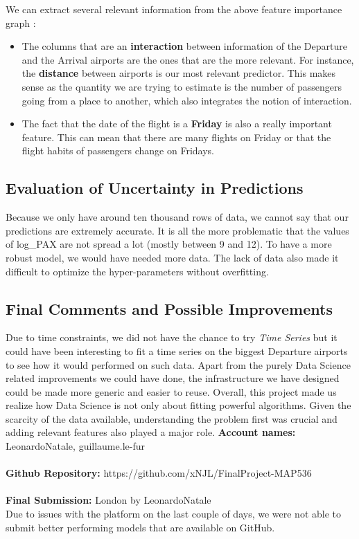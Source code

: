 \documentclass[a4paper,12pt,twoside]{article}
\begin{document}
We can extract several relevant information from the above feature importance graph :

\begin{itemize}
	\item The columns that are an \textbf{interaction} between information of the Departure and the Arrival airports are the ones that are the more relevant. For instance, the \textbf{distance} between airports is our most relevant predictor. This makes sense as the quantity we are trying to estimate is the number of passengers going from a place to another, which also integrates the notion of interaction.
	\item The fact that the date of the flight is a \textbf{Friday} is also a really important feature. This can mean that there are many flights on Friday or that the flight habits of passengers change on Fridays.
\end{itemize}

\subsection{Evaluation of Uncertainty in Predictions}

Because we only have around ten thousand rows of data, we cannot say that our predictions are extremely accurate. It is all the more problematic that the values of log\_PAX are not spread a lot (mostly between 9 and 12). To have a more robust model, we would have needed more data. The lack of data also made it difficult to optimize the hyper-parameters without overfitting.


\subsection{Final Comments and Possible Improvements}

Due to time constraints, we did not have the chance to try \textit{Time Series} but it could have been interesting to fit a time series on the biggest Departure airports to see how it would performed on such data.
Apart from the purely Data Science related improvements we could have done, the infrastructure we have designed could be made more generic and easier to reuse.
Overall, this project made us realize how Data Science is not only about fitting powerful algorithms. Given the scarcity of the data available, understanding the problem first was crucial and adding relevant features also played a major role.
\newline \newline \newline
\textbf{Account names:}
LeonardoNatale, guillaume.le-fur \\\\
\textbf{Github Repository:}
https://github.com/xNJL/FinalProject-MAP536 \\\\
\textbf{Final Submission:}
London by LeonardoNatale \\
Due to issues with the platform on the last couple of days, we were not able to submit better performing models that are available on GitHub.
\end{document}
